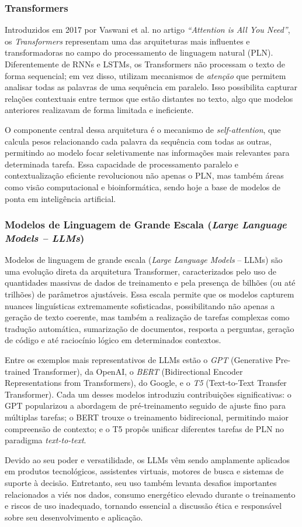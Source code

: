 \subsubsection{Transformers}

Introduzidos em 2017 por Vaswani et al. no artigo \emph{“Attention is All You Need”}, os \emph{Transformers} representam uma das arquiteturas mais influentes e transformadoras no campo do processamento de linguagem natural (PLN). Diferentemente de RNNs e LSTMs, os Transformers não processam o texto de forma sequencial; em vez disso, utilizam mecanismos de \emph{atenção} que permitem analisar todas as palavras de uma sequência em paralelo. Isso possibilita capturar relações contextuais entre termos que estão distantes no texto, algo que modelos anteriores realizavam de forma limitada e ineficiente.

O componente central dessa arquitetura é o mecanismo de \emph{self-attention}, que calcula pesos relacionando cada palavra da sequência com todas as outras, permitindo ao modelo focar seletivamente nas informações mais relevantes para determinada tarefa. Essa capacidade de processamento paralelo e contextualização eficiente revolucionou não apenas o PLN, mas também áreas como visão computacional e bioinformática, sendo hoje a base de modelos de ponta em inteligência artificial.

\subsubsection{Modelos de Linguagem de Grande Escala (\emph{Large Language Models -- LLMs})}

Modelos de linguagem de grande escala (\emph{Large Language Models} – LLMs) são uma evolução direta da arquitetura Transformer, caracterizados pelo uso de quantidades massivas de dados de treinamento e pela presença de bilhões (ou até trilhões) de parâmetros ajustáveis. Essa escala permite que os modelos capturem nuances linguísticas extremamente sofisticadas, possibilitando não apenas a geração de texto coerente, mas também a realização de tarefas complexas como tradução automática, sumarização de documentos, resposta a perguntas, geração de código e até raciocínio lógico em determinados contextos.

Entre os exemplos mais representativos de LLMs estão o \emph{GPT} (Generative Pre-trained Transformer), da OpenAI, o \emph{BERT} (Bidirectional Encoder Representations from Transformers), do Google, e o \emph{T5} (Text-to-Text Transfer Transformer). Cada um desses modelos introduziu contribuições significativas: o GPT popularizou a abordagem de pré-treinamento seguido de ajuste fino para múltiplas tarefas; o BERT trouxe o treinamento bidirecional, permitindo maior compreensão de contexto; e o T5 propôs unificar diferentes tarefas de PLN no paradigma \emph{text-to-text}.

Devido ao seu poder e versatilidade, os LLMs vêm sendo amplamente aplicados em produtos tecnológicos, assistentes virtuais, motores de busca e sistemas de suporte à decisão. Entretanto, seu uso também levanta desafios importantes relacionados a viés nos dados, consumo energético elevado durante o treinamento e riscos de uso inadequado, tornando essencial a discussão ética e responsável sobre seu desenvolvimento e aplicação.
